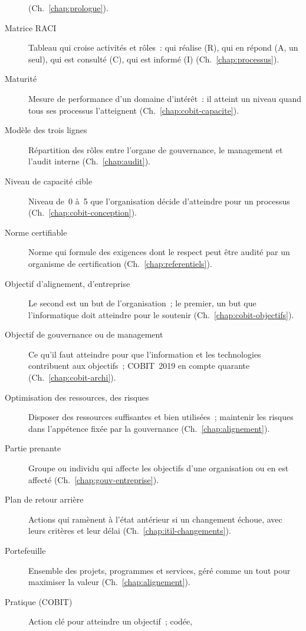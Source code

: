 \begin{description}
          (Ch.~\ref{chap:prologue}).
    \item[Matrice RACI] Tableau qui croise activités et rôles~: qui réalise
          (R), qui en répond (A, un seul), qui est consulté (C), qui est
          informé (I) (Ch.~\ref{chap:processus}).
    \item[Maturité] Mesure de performance d'un domaine d'intérêt~: il atteint
          un niveau quand tous ses processus l'atteignent
          (Ch.~\ref{chap:cobit-capacite}).
    \item[Modèle des trois lignes] Répartition des rôles entre l'organe de
          gouvernance, le management et l'audit interne
          (Ch.~\ref{chap:audit}).
    \item[Niveau de capacité cible] Niveau de~0 à~5 que l'organisation décide
          d'atteindre pour un processus (Ch.~\ref{chap:cobit-conception}).
    \item[Norme certifiable] Norme qui formule des exigences dont le respect
          peut être audité par un organisme de certification
          (Ch.~\ref{chap:referentiels}).
    \item[Objectif d'alignement, d'entreprise] Le second est un but de
          l'organisation~; le premier, un but que l'informatique doit
          atteindre pour le soutenir (Ch.~\ref{chap:cobit-objectifs}).
    \item[Objectif de gouvernance ou de management] Ce qu'il faut atteindre
          pour que l'information et les technologies contribuent aux
          objectifs~; COBIT~2019 en compte quarante
          (Ch.~\ref{chap:cobit-archi}).
    \item[Optimisation des ressources, des risques] Disposer des ressources
          suffisantes et bien utilisées~; maintenir les risques dans
          l'appétence fixée par la gouvernance (Ch.~\ref{chap:alignement}).
    \item[Partie prenante] Groupe ou individu qui affecte les objectifs d'une
          organisation ou en est affecté (Ch.~\ref{chap:gouv-entreprise}).
    \item[Plan de retour arrière] Actions qui ramènent à l'état antérieur si
          un changement échoue, avec leurs critères et leur délai
          (Ch.~\ref{chap:itil-changements}).
    \item[Portefeuille] Ensemble des projets, programmes et services, géré
          comme un tout pour maximiser la valeur (Ch.~\ref{chap:alignement}).
    \item[Pratique (COBIT)] Action clé pour atteindre un objectif~; codée,

\end{description}
